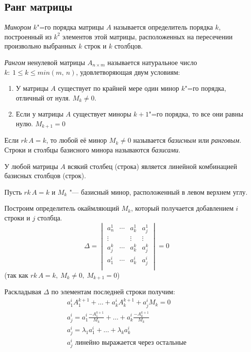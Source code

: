 \subsection*{Ранг матрицы}

\begin{definition}
  \textit{Минором} $k$"=го порядка матрицы $A$ называется определитель порядка $k$, построенный из $k^2$ элементов этой матрицы, расположенных на пересечении произвольно выбранных $k$ строк и $k$ столбцов.
\end{definition}
\begin{definition}
  \textit{Рангом} ненулевой  матрицы $A_{n\times m}$ называется натуральное число $k:~ 1 \leq k \leq min(m,\, n)$, удовлетворяющая двум условиям:
  \begin{enumerate}
    \item У матрицы $A$ существует по крайней мере один минор $k$"=го порядка, отличный от нуля. $M_k \neq 0$.
    \item Если у матрицы $A$ существует миноры $k+1$"=го порядка, то все они равны нулю. $M_{k+1} = 0$
  \end{enumerate}
\end{definition}

\begin{definition}
  Если $rk\,A = k$, то любой её минор $M_k \neq 0$ называется \textit{базисным} или \textit{ранговым}. Строки и столбцы базисного минора называются \textit{базисами}.
\end{definition}
\begin{theorem}
  У любой матрицы $A$ всякий столбец (строка) является линейной комбинацией базисных столбцов (строк).
\end{theorem}
\begin{Proof}
  Пусть $rk\,A = k$ и $M_k$ "--- базисный минор, расположенный в левом верхнем углу.

  Построим определитель окаймляющий $M_k$, который получается добавлением $i$ строки и $j$ столбца.
  \begin{equation*}
    \Delta = \begin{vmatrix}
      a_n^1 & \cdots & a_k^1 &  a_j^1 \\
      \vdots && \vdots & \vdots \\
      a_j^k & \cdots & a_k^k  & a_j^k \\
      a_1^i & \cdots & a_k^i & a_j^i \\
    \end{vmatrix} = 0
  \end{equation*}
  (так как $rk\,A = k,~ M_k \neq 0, ~M_{k + 1} = 0$)

  Раскладывая $\Delta$ по элементам последней строки получим:
  \begin{gather*}
    a_1^i A_1^{k+1} + \ldots + a_k^i A_k^{k + 1} + a_j^i M_k = 0 \\
    a_j^i = a_1^i \frac{-A_1^{k + 1}}{M_k} + \ldots + a_k^i \frac{-A_k^{k + 1}}{M_k} \\
    a_j^i = \lambda_1 a_1^i + \ldots + \lambda_k a_k^i \\
    a_j^i \text{ линейно выражается через остальные}
  \end{gather*}
\end{Proof}

